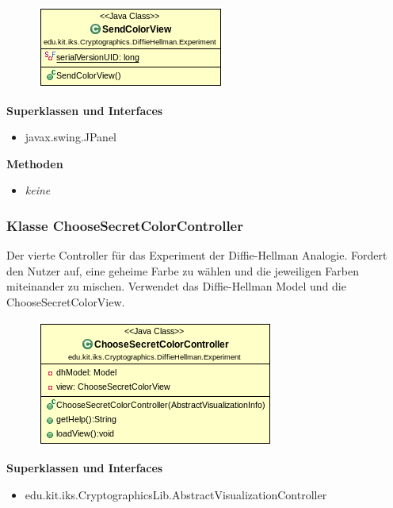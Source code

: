 \documentclass{article}
\begin{document}
      \begin{figure}[H]
        \centering
        \includegraphics{resources/edu-kit-iks-Cryptographics-DiffieHellman-Experiment-SendColorView}
      \end{figure}

      \textbf{Superklassen und Interfaces}
      \begin{itemize}
        \item javax.swing.JPanel
      \end{itemize}

      \textbf{Methoden}
      \begin{itemize}
        \item \textit{keine}
      \end{itemize}

\subsubsection{Klasse ChooseSecretColorController}
      Der vierte Controller für das Experiment der Diffie-Hellman Analogie.
      Fordert den Nutzer auf, eine geheime Farbe zu wählen und die
      jeweiligen Farben miteinander zu mischen.
      Verwendet das Diffie-Hellman Model und die ChooseSecretColorView.

      \begin{figure}[H]
        \centering
        \includegraphics{resources/edu-kit-iks-Cryptographics-DiffieHellman-Experiment-ChooseSecretColorController}
      \end{figure}

      \textbf{Superklassen und Interfaces}
      \begin{itemize}
        \item edu.kit.iks.CryptographicsLib.AbstractVisualizationController
      \end{itemize}
\end{document}

